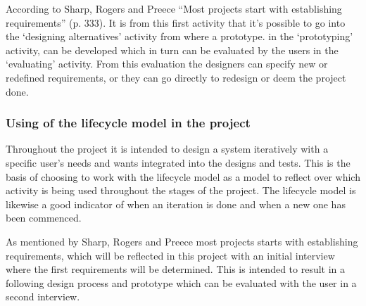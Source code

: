 According to Sharp, Rogers and Preece “Most projects start with establishing requirements” (p. 333). It is from this first activity that it’s possible to go into the ‘designing alternatives’ activity from where a prototype. in the ‘prototyping’ activity, can be developed which in turn can be evaluated by the users in the ‘evaluating’ activity. From this evaluation the designers can specify new or redefined requirements, or they can go directly to redesign or deem the project done.

\subsubsection{Using of the lifecycle model in the project}
Throughout the project it is intended to design a system iteratively with a specific user’s needs and wants integrated into the designs and tests. This is the basis of choosing to work with the lifecycle model as a model to reflect over which activity is being used throughout the stages of the project. The lifecycle model is likewise a good indicator of when an iteration is done and when a new one has been commenced. 

As mentioned by Sharp, Rogers and Preece most projects starts with establishing requirements, which will be reflected in this project with an initial interview where the first requirements will be determined. This is intended to result in a following design process and prototype which can be evaluated with the user in a second interview.

